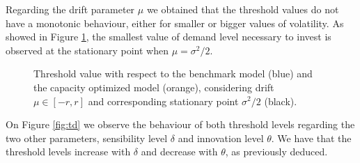 Regarding the drift parameter $\mu$ we obtained that the threshold values do not have a monotonic behaviour, either for smaller or bigger values of volatility. As showed in Figure \ref{fig:mu}, the smallest value of demand level necessary to invest is observed at the stationary point when $\mu=\sigma^2/2$.

\begin{figure}[!htb]
	\begin{subfigmatrix}{2}
	\end{subfigmatrix}
	\caption{Threshold value with respect to the benchmark model (blue) and the capacity optimized model (orange), considering drift $\mu \in [-r, r]$ and corresponding stationary point $\sigma^2/2$ (black).}
	\label{fig:mu}
\end{figure}

On Figure \ref{fig:td} we observe the behaviour of both threshold levels regarding the two other parameters, sensibility level $\delta$ and innovation level $\theta$. We have that the threshold levels increase with $\delta$ and decrease with $\theta$, as previously deduced.

